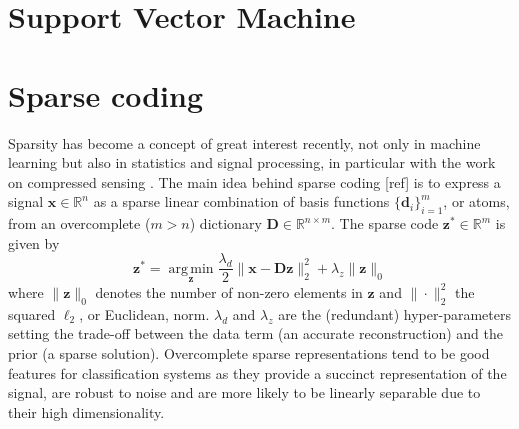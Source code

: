 \documentclass[a4paper,12pt,twoside]{report}
\newcommand{\R}{\mathbb{R}}
\DeclareMathOperator*{\argminop}{arg\,min}
\newcommand{\argmin}[1]{\argminop\limits_{#1}}
\newcommand{\normT}[1]{\| #1 \|_2^2}
\newcommand{\normZ}[1]{\| #1 \|_0}
\newcommand{\D}{\mathbf{D}}
\renewcommand{\d}{\mathbf{d}}
\newcommand{\x}{\mathbf{x}}
\newcommand{\z}{\mathbf{z}}
\newcommand{\set}[2]{\{#1_i\}_{i=1}^#2}
\begin{document}
\section{Support Vector Machine}

\section{Sparse coding} \label{sec:sparse_coding}

Sparsity has become a concept of great interest recently, not only in
machine learning but also in statistics and signal processing, in particular with the work on compressed sensing \cite{candes2005CS, donoho2006CS}. The main idea behind sparse coding {\color{red} [ref]} is to express a signal $\x \in \R^n$ as a sparse linear combination of basis functions $\set{\d}{m}$, or atoms, from an overcomplete ($m>n$) dictionary $\D \in \R^{n \times m}$. The sparse code $\z^* \in \R^m$ is given by
\begin{equation}\label{eqn:sparsecoding}
	\z^* = \argmin{\z} \frac{\lambda_d}{2} \normT{\x - \D \z} + \lambda_z \normZ{\z}
\end{equation}
where $\normZ{\z}$ denotes the number of non-zero elements in $\z$ and $\normT{\cdot}$ the squared $\ell_2$, or Euclidean, norm. $\lambda_d$ and $\lambda_z$ are the (redundant) hyper-parameters setting the trade-off between the data term (an accurate reconstruction) and the prior (a sparse solution). Overcomplete sparse representations tend to be good features for classification systems as they provide a succinct representation of the signal, are robust to noise and are more likely to be linearly separable due to their high dimensionality.
\end{document}
